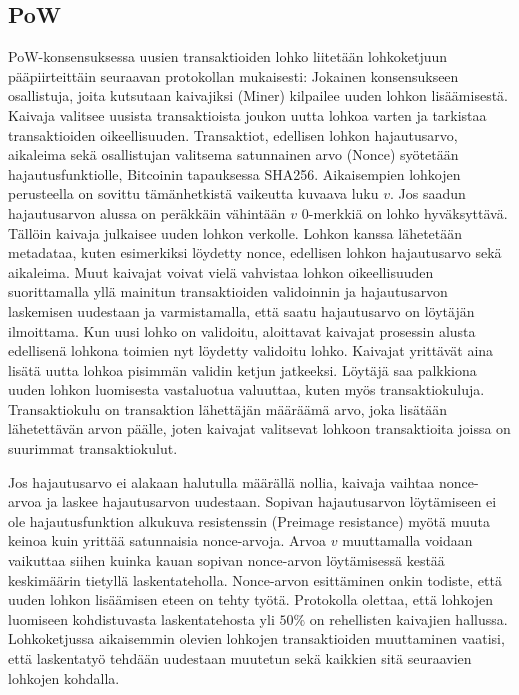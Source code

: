 \subsection{PoW}
PoW-konsensuksessa uusien transaktioiden lohko liitetään lohkoketjuun pääpiirteittäin seuraavan protokollan mukaisesti: Jokainen konsensukseen osallistuja, joita kutsutaan kaivajiksi (Miner) kilpailee uuden lohkon lisäämisestä. Kaivaja valitsee uusista transaktioista joukon uutta lohkoa varten ja tarkistaa transaktioiden oikeellisuuden. Transaktiot, edellisen lohkon hajautusarvo, aikaleima sekä osallistujan valitsema satunnainen arvo (Nonce) syötetään hajautusfunktiolle, Bitcoinin tapauksessa SHA256. Aikaisempien lohkojen perusteella on sovittu tämänhetkistä vaikeutta kuvaava luku $v$. Jos saadun hajautusarvon alussa on peräkkäin vähintään $v$ 0-merkkiä on lohko hyväksyttävä. Tällöin kaivaja julkaisee uuden lohkon verkolle. Lohkon kanssa lähetetään metadataa, kuten esimerkiksi löydetty nonce, edellisen lohkon hajautusarvo sekä aikaleima. Muut kaivajat voivat vielä vahvistaa lohkon oikeellisuuden suorittamalla yllä mainitun transaktioiden validoinnin ja hajautusarvon laskemisen uudestaan ja varmistamalla, että saatu hajautusarvo on löytäjän ilmoittama. Kun uusi lohko on validoitu, aloittavat kaivajat prosessin alusta edellisenä lohkona toimien nyt löydetty validoitu lohko. Kaivajat yrittävät aina lisätä uutta lohkoa pisimmän validin ketjun jatkeeksi. Löytäjä saa palkkiona uuden lohkon luomisesta vastaluotua valuuttaa, kuten myös transaktiokuluja. Transaktiokulu on transaktion lähettäjän määräämä arvo, joka lisätään lähetettävän arvon päälle, joten kaivajat valitsevat lohkoon transaktioita joissa on suurimmat transaktiokulut.

Jos hajautusarvo ei alakaan halutulla määrällä nollia, kaivaja vaihtaa nonce-arvoa ja laskee hajautusarvon uudestaan. Sopivan hajautusarvon löytämiseen ei ole hajautusfunktion alkukuva resistenssin (Preimage resistance) myötä muuta keinoa kuin yrittää satunnaisia nonce-arvoja. Arvoa $v$ muuttamalla voidaan vaikuttaa siihen kuinka kauan sopivan nonce-arvon löytämisessä kestää keskimäärin tietyllä laskentateholla. Nonce-arvon esittäminen onkin todiste, että uuden lohkon lisäämisen eteen on tehty työtä. Protokolla olettaa, että lohkojen luomiseen kohdistuvasta laskentatehosta yli $50\%$ on rehellisten kaivajien hallussa. Lohkoketjussa aikaisemmin olevien lohkojen transaktioiden muuttaminen vaatisi, että laskentatyö tehdään uudestaan muutetun sekä kaikkien sitä seuraavien lohkojen kohdalla.

